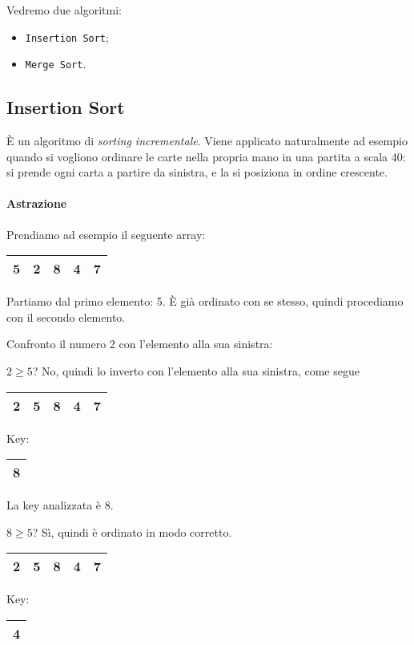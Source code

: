 \noindent Vedremo due algoritmi:
\begin{itemize}[noitemsep]
	\item \texttt{Insertion Sort};
	\item \texttt{Merge Sort}.
\end{itemize}

\subsection{Insertion Sort}
È un algoritmo di \emph{sorting incrementale}. Viene applicato naturalmente ad esempio quando si vogliono ordinare le carte nella propria mano in una partita a scala 40: si prende ogni carta a partire da sinistra, e la si posiziona in ordine crescente.\par
\paragraph{Astrazione} Prendiamo ad esempio il seguente array:

\begin{center}
	\begin{tabular}{|l|l|l|l|l|}
		\hline
		5 & 2 & 8 & 4 & 7 \\
		\hline
	\end{tabular}
\end{center}

\noindent Partiamo dal primo elemento: 5. È già ordinato con se stesso, quindi procediamo con il secondo elemento.\par
\noindent Confronto il numero 2 con l'elemento alla sua sinistra: \par
$2 \geq 5$?  No, quindi lo inverto con l'elemento alla sua sinistra, come segue

\begin{center}
	\begin{tabular}{|l|l|l|l|l|}
		\hline
		2 & 5 & 8 & 4 & 7 \\
		\hline
	\end{tabular}
	\hspace{1cm} Key: 
	\begin{tabular}{|l|}
		\hline
		8 \\
		\hline
	\end{tabular}
\end{center}

\noindent La key analizzata è 8. \par
$8 \geq 5$? Sì, quindi è ordinato in modo corretto.

\begin{center}
	\begin{tabular}{|l|l|l|l|l|}
		\hline
		2 & 5 & 8 & 4 & 7 \\
		\hline
	\end{tabular}
	\hspace{1cm} Key: 
	\begin{tabular}{|l|}
		\hline
		4 \\
		\hline
	\end{tabular}
\end{center}

